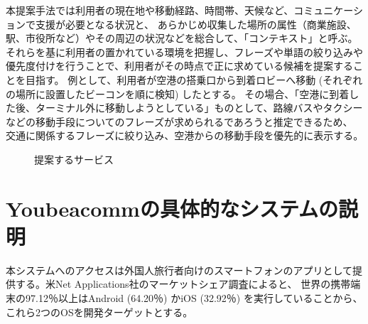 \documentclass[11pt,papersize]{jsbook}
\begin{document}
本提案手法では利用者の現在地や移動経路、時間帯、天候など、コミュニケーションで支援が必要となる状況と、
あらかじめ収集した場所の属性（商業施設、駅、市役所など）やその周辺の状況などを総合して、「コンテキスト」と呼ぶ。
それらを基に利用者の置かれている環境を把握し、フレーズや単語の絞り込みや優先度付けを行うことで、利用者がその時点で正に求めている候補を提案することを目指す。
例として、利用者が空港の搭乗口から到着ロビーへ移動 (それぞれの場所に設置したビーコンを順に検知) したとする。
その場合、「空港に到着した後、ターミナル外に移動しようとしている」ものとして、路線バスやタクシーなどの移動手段についてのフレーズが求められるであろうと推定できるため、
交通に関係するフレーズに絞り込み、空港からの移動手段を優先的に表示する。
\begin{figure}[htbp]
 \begin{center}
 \end{center}
 \caption{提案するサービス}
 \label{fig:use_flow}
\end{figure}

\section{Youbeacommの具体的なシステムの説明}\label{sec:yonnoni}
 本システムへのアクセスは外国人旅行者向けのスマートフォンのアプリとして提供する。米Net Applications社のマーケットシェア調査\cite{b}によると、
世界の携帯端末の97.12％以上はAndroid (64.20％) かiOS (32.92％) を実行していることから、これら2つのOSを開発ターゲットとする。
\end{document}
